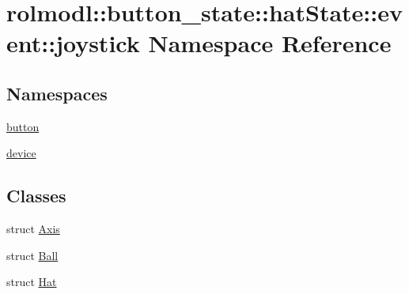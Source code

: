 \hypertarget{namespacerolmodl_1_1button__state_1_1hat_state_1_1event_1_1joystick}{}\section{rolmodl\+::button\+\_\+state\+::hat\+State\+::event\+::joystick Namespace Reference}
\label{namespacerolmodl_1_1button__state_1_1hat_state_1_1event_1_1joystick}
\subsection*{Namespaces}
\begin{DoxyCompactItemize}
\item 
 \mbox{\hyperlink{namespacerolmodl_1_1button__state_1_1hat_state_1_1event_1_1joystick_1_1button}{button}}
\item 
 \mbox{\hyperlink{namespacerolmodl_1_1button__state_1_1hat_state_1_1event_1_1joystick_1_1device}{device}}
\end{DoxyCompactItemize}
\subsection*{Classes}
\begin{DoxyCompactItemize}
\item 
struct \mbox{\hyperlink{structrolmodl_1_1button__state_1_1hat_state_1_1event_1_1joystick_1_1_axis}{Axis}}
\item 
struct \mbox{\hyperlink{structrolmodl_1_1button__state_1_1hat_state_1_1event_1_1joystick_1_1_ball}{Ball}}
\item 
struct \mbox{\hyperlink{structrolmodl_1_1button__state_1_1hat_state_1_1event_1_1joystick_1_1_hat}{Hat}}
\end{DoxyCompactItemize}
